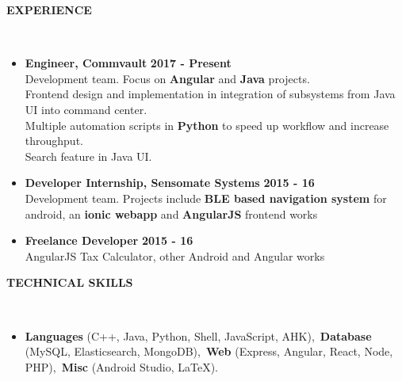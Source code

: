 \documentclass[a4paper,10pt]{article}
\newcommand{\lsep}{-0.5cm}
\newcommand{\resheading}[1]{{\small \colorbox{mygrey}{\begin{minipage}{0.975\textwidth}{\textbf{\uppercase{#1} \vphantom{p\^{E}}}}\end{minipage}}}}
\newcommand{\when}[1]{\hfill \textbf{#1}}
\newenvironment{noSepItemize}
{ \begin{itemize}
    \setlength{\itemsep}{1pt}
    \setlength{\parskip}{0pt}
    \setlength{\parsep}{0pt}     }
{ \end{itemize}                  }
\begin{document}
\resheading{\textbf{Experience} }\\[\lsep]
\begin{noSepItemize}
\item \noindent \textbf{Engineer, Commvault} \when{2017 - Present}\\
	\indent Development team. Focus on \textbf{Angular} and \textbf{Java} projects.\\
	\indent Frontend design and implementation in integration of subsystems from Java UI into command center.\\
	\indent Multiple automation scripts in \textbf{Python} to speed up workflow and increase throughput.\\
	\indent Search feature in Java UI.
\item \noindent \textbf{Developer Internship, Sensomate Systems} \when{2015 - 16}\\
	\indent Development team. Projects include \textbf{BLE based navigation system} for android, an \textbf{ionic webapp} and \textbf{AngularJS} frontend works
\item \noindent \textbf{Freelance Developer} \when{2015 - 16}\\
	\indent AngularJS Tax Calculator, other Android and Angular works
\end{noSepItemize}

\resheading{\textbf{TECHNICAL SKILLS} }\\[\lsep]
\begin{noSepItemize}
\item \noindent \textbf{Languages} (C++, Java, Python, Shell, JavaScript, AHK),\, \textbf{Database} (MySQL, Elasticsearch, MongoDB),\, \textbf{Web} (Express, Angular, React, Node, PHP),\, \textbf{Misc} (Android Studio, \LaTeX).
\end{noSepItemize}
\end{document}
